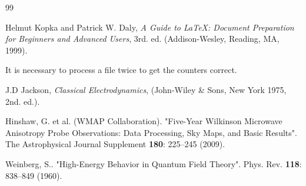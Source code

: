 \documentclass[twocolumn]{revtex4}
\begin{document}
\begin{thebibliography}{99}

Helmut Kopka and Patrick W. Daly, \textsl{A Guide to
\LaTeX: Document Preparation for Beginners and Advanced Users}, 3rd. ed. (Addison-Wesley, Reading, MA, 1999).

 It is necessary to process a file twice to
get the counters correct.

 J.D Jackson, {\it Classical Electrodynamics}, (John-Wiley
\& Sons, New York 1975, 2nd. ed.).
  

 Hinshaw, G. et al. (WMAP Collaboration). 
"Five-Year Wilkinson Microwave Anisotropy Probe Observations: 
Data Processing, Sky Maps, and Basic Results". 
The Astrophysical Journal Supplement {\bf 180}: 225–245 (2009). 

 Weinberg, S.. "High-Energy Behavior in Quantum 
Field Theory". Phys. Rev. {\bf 118}: 838–849 (1960). 


\end{thebibliography}
\end{document}
